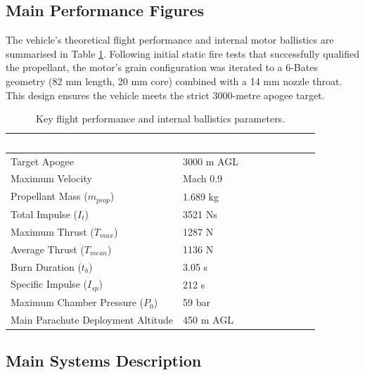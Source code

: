 \documentclass[11pt,a4paper]{article}
\begin{document}
\subsection{Main Performance Figures}

The vehicle's theoretical flight performance and internal motor ballistics are summarised in Table \ref{tab:performance_figures}. Following initial static fire tests that successfully qualified the propellant, the motor's grain configuration was iterated to a 6-Bates geometry (82 mm length, 20 mm core) combined with a 14 mm nozzle throat. This design ensures the vehicle meets the strict 3000-metre apogee target.

\begin{table}[H]
    \centering
    \caption{Key flight performance and internal ballistics parameters.}
    \label{tab:performance_figures}
    \begin{tabularx}{\textwidth}{|X|X|}
        \hline
        \rowcolor{EtseNavy}
        \textbf{\textcolor{white}{Parameter}} & \textbf{\textcolor{white}{Estimated Value / Target}} \\ \hline
        Target Apogee & 3000 m AGL \\ \hline
        \rowcolor{LightGrayTable}
        Maximum Velocity & Mach 0.9 \\ \hline 
        Propellant Mass ($m_{prop}$) & 1.689 kg \\ \hline
        \rowcolor{LightGrayTable}
        Total Impulse ($I_t$) & 3521 Ns \\ \hline
        Maximum Thrust ($T_{max}$) & 1287 N \\ \hline
        \rowcolor{LightGrayTable}
        Average Thrust ($T_{mean}$) & 1136 N \\ \hline
        Burn Duration ($t_b$) & 3.05 s \\ \hline
        \rowcolor{LightGrayTable}
        Specific Impulse ($I_{sp}$) & 212 s \\ \hline
        Maximum Chamber Pressure ($P_0$) & 59 bar \\ \hline
        \rowcolor{LightGrayTable}
        Main Parachute Deployment Altitude & 450 m AGL \\ \hline 
    \end{tabularx}
\end{table}


\subsection{Main Systems Description}
\end{document}
